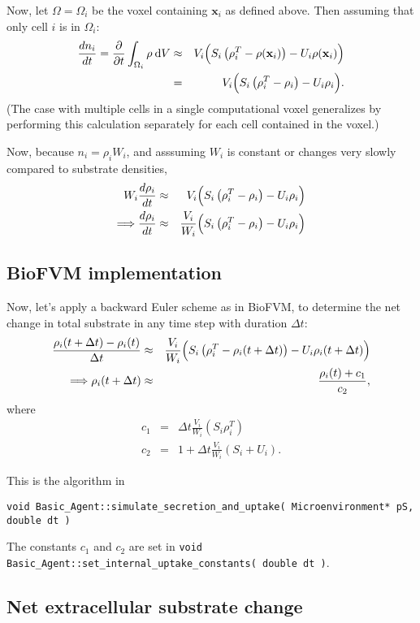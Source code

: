 \documentclass[11point]{article}
\newcommand{\beq}{\begin{eqnarray}}
\newcommand{\eeq}{\end{eqnarray}}
\renewcommand{\d}[1]{\:\mathrm{d}#1}
\renewcommand{\vec}[1]{\mathbf{#1}}
\begin{document}
Now, let $\Omega = \Omega_i$ be the voxel containing $\vec{x}_i$ as 
defined above. Then assuming that only cell $i$ is in $\Omega_i$:  \beq
\frac{ d{n_i} }{ d{t} }  
= 
\frac{ \partial }{ \partial t} 
\int_{\Omega_i} \rho \d{V}
 & \approx &  
V_i 
\Bigl(  S_i \left( \rho^T_i - \rho(\vec{x}_i) \right)  - U_i \rho(\vec{x}_i)   \Bigr)  \\
& = & 
V_i 
\Bigl(  S_i \left( \rho^T_i - \rho_i \right)  - U_i \rho_i   \Bigr) .
\eeq 
(The case with multiple cells in a single computational voxel generalizes by performing this calculation separately for each cell contained in the voxel.)

Now, because $n_i = \rho_i W_i $, and asssuming $W_i$ is constant or changes very slowly compared to substrate densities, 
\beq
W_i \frac{ d{\rho_i} }{ d{t} }  & \approx &  
V_i 
\Bigl(  S_i \left( \rho^T_i - \rho_i \right)  - U_i \rho_i   \Bigr)   \\
\Longrightarrow 
\frac{d\rho_i }{dt} & \approx & 
\frac{ V_i }{W_i }
\Bigl( S_i \left( \rho_i^T - \rho_i \right) - U_i \rho_i \Bigr) 
\eeq 

\subsection{BioFVM implementation}
Now, let's apply a backward Euler scheme as in BioFVM, to determine the net change in total substrate in any time step with duration $\Delta t$: 
\beq
\frac{ \rho_i(t+\Delta t) - \rho_i(t)}{\Delta t} 
& \approx & 
\frac{ V_i }{W_i } 
\Bigl( S_i \left( \rho_i^T - \rho_i(t+\Delta t) \right) 
- U_i \rho_i( t + \Delta t ) \Bigr)\\
\Longrightarrow 
\rho_i( t+\Delta t) 
& \approx & 
\frac{\rho_i(t)  + c_1 }{c_2},
\eeq
where 
\beq
c_1 & = & \Delta t \frac{ V_i }{W_i } 
\left( S_i \rho_i^T \right) \\ 
c_2 & = & 1 + \Delta t \frac{ V_i }{W_i } 
\left( S_i + U_i \right) .
\eeq

This is the algorithm in 

\begin{center}\verb|void Basic_Agent::simulate_secretion_and_uptake( Microenvironment* pS, double dt )|
\end{center}

The constants $c_1$ and $c_2$ are set in 
\verb|void Basic_Agent::set_internal_uptake_constants( double dt )|. 

\subsection{Net extracellular substrate change}
\end{document}
